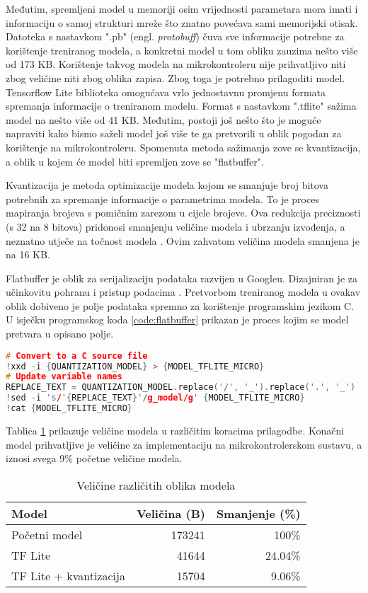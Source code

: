 Međutim, spremljeni model u memoriji osim vrijednosti parametara mora imati i informaciju 
o samoj strukturi mreže što znatno povećava sami memorijski otisak. Datoteka s nastavkom
".pb" (engl. \textit{protobuff}) čuva sve informacije potrebne za korištenje treniranog modela,
a konkretni model u tom obliku zauzima nešto više od 173 KB. Korištenje takvog modela
na mikrokontroleru nije prihvatljivo niti zbog veličine niti zbog oblika zapisa. Zbog 
toga je potrebno prilagoditi model. Tensorflow Lite biblioteka omogućava vrlo jednostavnu
promjenu formata spremanja informacije o treniranom modelu. Format s nastavkom ".tflite"
sažima model na nešto više od 41 KB. Međutim, postoji još nešto što je moguće napraviti
kako bismo saželi model još više te ga pretvorili u oblik pogodan za korištenje na
mikrokontroleru. Spomenuta metoda sažimanja zove se kvantizacija, a oblik u kojem će model
biti spremljen zove se "flatbuffer".

Kvantizacija je metoda optimizacije modela kojom se smanjuje broj bitova potrebnih za
spremanje informacije o parametrima modela. 
To je proces mapiranja brojeva s pomičnim zarezom u cijele brojeve.
Ova redukcija preciznosti (s 32 na 8 bitova)
pridonosi smanjenju veličine modela i ubrzanju izvođenja, a neznatno utječe na točnost
modela \cite{quantization}. Ovim zahvatom veličina modela smanjena je na 16 KB. 

Flatbuffer je oblik za serijalizaciju podataka razvijen u Googleu. Dizajniran je
za učinkovitu pohranu i pristup podacima \cite{flatbuffers_docs}. 
Pretvorbom treniranog modela u ovakav oblik
dobiveno je polje podataka spremno za korištenje programskim jezikom C.
U isječku programskog koda \ref{code:flatbuffer} prikazan je proces kojim se model pretvara u opisano 
polje.

\begin{lstlisting}[language=C++, caption=Pretvorba u Flatbuffer, label=code:flatbuffer]
# Convert to a C source file
!xxd -i {QUANTIZATION_MODEL} > {MODEL_TFLITE_MICRO}
# Update variable names
REPLACE_TEXT = QUANTIZATION_MODEL.replace('/', '_').replace('.', '_')
!sed -i 's/'{REPLACE_TEXT}'/g_model/g' {MODEL_TFLITE_MICRO}
!cat {MODEL_TFLITE_MICRO}
\end{lstlisting}

Tablica \ref{tab:model_sizes} prikazuje veličine modela u različitim koracima prilagodbe.
Konačni model prihvatljive je veličine za implementaciju na mikrokontrolerskom sustavu, 
a iznosi svega 9\% početne veličine modela.

\begin{table}[htb]
    \centering
    \begin{tabular}{|l|r|r|}
        \hline
        \textbf{Model} & \textbf{Veličina (B)} & \textbf{Smanjenje (\%)} \\ \hline
        Početni model & 173241 & 100\% \\ \hline
        TF Lite & 41644 & 24.04\% \\ \hline
        TF Lite + kvantizacija & 15704 & 9.06\% \\ \hline
    \end{tabular}
    \caption{Veličine različitih oblika modela}
    \label{tab:model_sizes}
\end{table}
